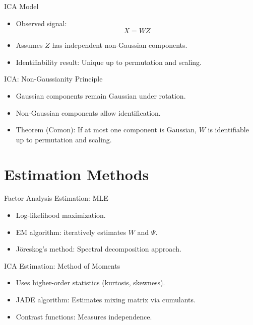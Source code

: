 \documentclass[11pt,handout,aspectratio=169]{beamer}
\begin{document}
\begin{frame}{ICA Model}
    \begin{itemize}
        \item Observed signal: \[ X = WZ \]
        \item Assumes $Z$ has independent non-Gaussian components.
        \item Identifiability result: Unique up to permutation and scaling.
    \end{itemize}
\end{frame}

\begin{frame}{ICA: Non-Gaussianity Principle}
    \begin{itemize}
        \item Gaussian components remain Gaussian under rotation.
        \item Non-Gaussian components allow identification.
        \item Theorem (Comon): If at most one component is Gaussian, $W$ is identifiable up to permutation and scaling.
    \end{itemize}
\end{frame}

\section{Estimation Methods}

\begin{frame}{Factor Analysis Estimation: MLE}
    \begin{itemize}
        \item Log-likelihood maximization.
        \item EM algorithm: iteratively estimates $W$ and $\Psi$.
        \item J\"oreskog's method: Spectral decomposition approach.
    \end{itemize}
\end{frame}

\begin{frame}{ICA Estimation: Method of Moments}
    \begin{itemize}
        \item Uses higher-order statistics (kurtosis, skewness).
        \item JADE algorithm: Estimates mixing matrix via cumulants.
        \item Contrast functions: Measures independence.
    \end{itemize}
\end{frame}
\end{document}
